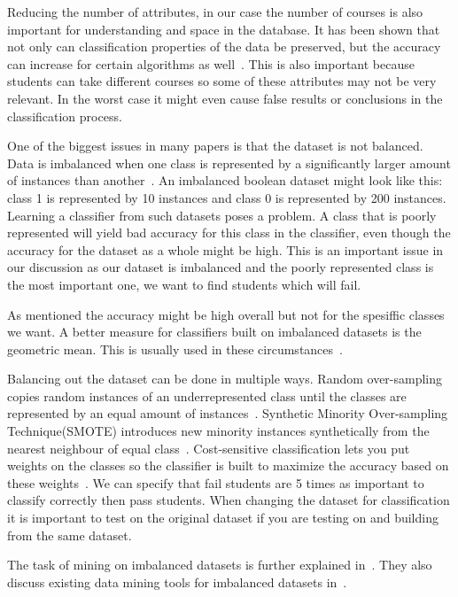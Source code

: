 \bigskip\noindent
Reducing the number of attributes, in our case the number of courses is also important for understanding and space in the database.
It has been shown that not only can classification properties of the data be preserved, but the accuracy can increase for certain algorithms as well~\cite{9}.
This is also important because students can take different courses so some of these attributes may not be very relevant. 
In the worst case it might even cause false results or conclusions in the classification process.

\bigskip\noindent
One of the biggest issues in many papers is that the dataset is not balanced. 
Data is imbalanced when one class is represented by a significantly larger amount of instances than another~\cite{10}. 
An imbalanced boolean dataset might look like this: class 1 is represented by 10 instances and class 0 is represented by 200 instances. 
Learning a classifier from such datasets poses a problem. 
A class that is poorly represented will yield bad accuracy for this class in the classifier, 
even though the accuracy for the dataset as a whole might be high. 
This is an important issue in our discussion as our dataset is imbalanced and the poorly represented class is the most important one, 
we want to find students which will fail.

\bigskip\noindent
As mentioned the accuracy might be high overall but not for the spesiffic classes we want.
A better measure for classifiers built on imbalanced datasets is the geometric mean. 
This is usually used in these circumstances~\cite{12}. 

\bigskip\noindent
Balancing out the dataset can be done in multiple ways. 
Random over-sampling copies random instances of an underrepresented class until the classes are represented by an equal amount of instances~\cite{12}. 
Synthetic Minority Over-sampling Technique(SMOTE) introduces new minority instances synthetically from the nearest neighbour of equal class~\cite{9}. 
Cost-sensitive classification lets you put weights on the classes so the classifier is built to maximize the accuracy based on these weights~\cite{9}. 
We can specify that fail students are 5 times as important to classify correctly then pass students. 
When changing the dataset for classification it is important to test on the original dataset if you are testing on and building from the same dataset.

\bigskip\noindent
The task of mining on imbalanced datasets is further explained in~\cite{10}.
They also discuss existing data mining tools for imbalanced datasets in~\cite{8}.

